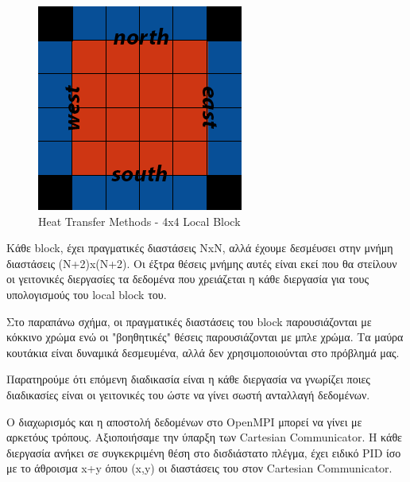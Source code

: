 \documentclass[../final_report.tex]{subfiles}
\begin{document}
\begin{figure}[H]
    \centering
    \includegraphics[scale=3]{local_block.png}
    \caption{Heat Transfer Methods - 4x4 Local Block}
    \label{fig:Heat Transfer Methods - Local Block}
\end{figure}

Κάθε block, έχει πραγματικές διαστάσεις NxN, αλλά έχουμε δεσμέυσει στην μνήμη διαστάσεις (N+2)x(N+2). Οι έξτρα θέσεις μνήμης αυτές είναι εκεί που θα 
στείλουν οι γειτονικές διεργασίες τα δεδομένα που χρειάζεται η κάθε διεργασία για τους υπολογισμούς του local block του.

Στο παραπάνω σχήμα, οι πραγματικές διαστάσεις του block παρουσιάζονται με κόκκινο χρώμα ενώ οι "βοηθητικές" θέσεις παρουσιάζονται με μπλε χρώμα. Τα 
μαύρα κουτάκια είναι δυναμικά δεσμευμένα, αλλά δεν χρησιμοποιούνται στο πρόβλημά μας.

Παρατηρούμε ότι επόμενη διαδικασία είναι η κάθε διεργασία να γνωρίζει ποιες διαδικασίες είναι οι γειτονικές του ώστε να γίνει σωστή ανταλλαγή δεδομένων.

Ο διαχωρισμός και η αποστολή δεδομένων στο OpenMPI μπορεί να γίνει με αρκετόυς τρόπους. Αξιοποιήσαμε την ύπαρξη των Cartesian Communicator. Η κάθε
διεργασία ανήκει σε συγκεκριμένη θέση στο δισδιάστατο πλέγμα, έχει ειδικό PID ίσο με το άθροισμα x+y όπου (x,y) οι διαστάσεις του στον Cartesian Communicator.
\end{document}
